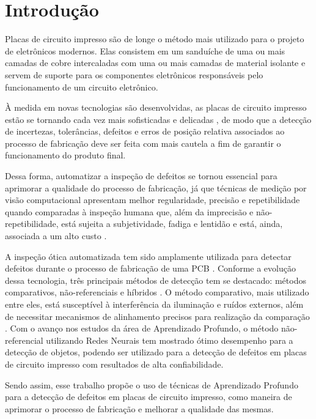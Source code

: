 \chapter{Introdução}
Placas de circuito impresso são de longe o método mais utilizado para o projeto de eletrônicos modernos. Elas consistem em um sanduíche de uma ou mais camadas de cobre intercaladas com uma ou mais camadas de material isolante \cite{ref:Zumbahlen} e servem de suporte para os componentes eletrônicos responsáveis pelo funcionamento de um circuito eletrônico.

À medida em novas tecnologias são desenvolvidas, as placas de circuito impresso estão se tornando cada vez mais sofisticadas e delicadas \cite{ref:Hu-Wang}, de modo que a detecção de incertezas, tolerâncias, defeitos e erros de posição relativa associados ao processo de fabricação \cite{ref:Leta-Feliciano-Martins} deve ser feita com mais cautela a fim de garantir o funcionamento do produto final.

Dessa forma, automatizar a inspeção de defeitos se tornou essencial para aprimorar a qualidade do processo de fabricação, já que técnicas de medição por visão computacional apresentam melhor regularidade, precisão e repetibilidade quando comparadas à inspeção humana que, além da imprecisão e não-repetibilidade, está sujeita a subjetividade, fadiga e lentidão e está, ainda, associada a um alto custo \cite{ref:Leta-Feliciano-Martins}.

A inspeção ótica automatizada tem sido amplamente utilizada para detectar defeitos durante o processo de fabricação de uma PCB \cite{ref:Chin-Harlow}. Conforme a evolução dessa tecnologia, três principais métodos de detecção tem se destacado: métodos comparativos, não-referenciais e híbridos \cite{ref:Wu-Wang-Liu}. O método comparativo, mais utilizado entre eles, está susceptível à interferência da iluminação e ruídos externos, além de necessitar mecanismos de alinhamento precisos para realização da comparação \cite{ref:Hu-Wang}. Com o avanço nos estudos da área de Aprendizado Profundo, o método não-referencial utilizando Redes Neurais tem mostrado ótimo desempenho para a detecção de objetos, podendo ser utilizado para a detecção de defeitos em placas de circuito impresso com resultados de alta confiabilidade.

Sendo assim, esse trabalho propõe o uso de técnicas de Aprendizado Profundo para a detecção de defeitos em placas de circuito impresso, como maneira de aprimorar o processo de fabricação e melhorar a qualidade das mesmas.

